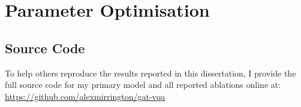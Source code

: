 \chapter{Parameter Optimisation}
\label{appendix:parameter_optimisation}

\section{Source Code}
To help others reproduce the results reported in this dissertation, I provide the full source code for my primary model and all reported ablations online at: \url{https://github.com/alexmirrington/gat-vqa}

